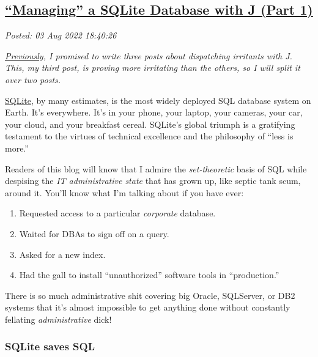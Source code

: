 %

\subsection*{\href{https://analyzethedatanotthedrivel.org/2022/08/03/managing-a-sqlite-database-with-j-part-1/}{``Managing'' a SQLite Database with J (Part 1)}}


\noindent\emph{Posted: 03 Aug 2022 18:40:26}
\vspace{6pt}

\emph{\href{https://analyzethedatanotthedrivel.org/2022/07/17/branding-xmp-sidecar-files-with-j/}{Previously},
I promised to write three posts about dispatching irritants with J.
This, my third post, is proving more irritating than the others, so I
will split it over two posts.}

\bigskip

\href{https://sqlite.org/index.html}{SQLite}, by many estimates, is the
most widely deployed SQL database system on Earth. It's everywhere. It's
in your phone, your laptop, your cameras, your car, your cloud, and your
breakfast cereal. SQLite's global triumph is a gratifying testament to
the virtues of technical excellence and the philosophy of ``less is
more.''

Readers of this blog will know that I admire the \emph{set-theoretic}
basis of SQL while despising the \emph{IT administrative state} that has
grown up, like septic tank scum, around it. You'll know what I'm talking
about if you have ever:

\begin{enumerate}
\tightlist
\item
  Requested access to a particular \emph{corporate} database.
\item
  Waited for DBAs to sign off on a query.
\item
  Asked for a new index.
\item
  Had the gall to install ``unauthorized'' software tools in ``production.''
\end{enumerate}

There is so much administrative shit covering big Oracle, SQLServer, or
DB2 systems that it's almost impossible to get anything done without
constantly fellating \emph{administrative} dick!

\subsubsection*{SQLite saves SQL}%

